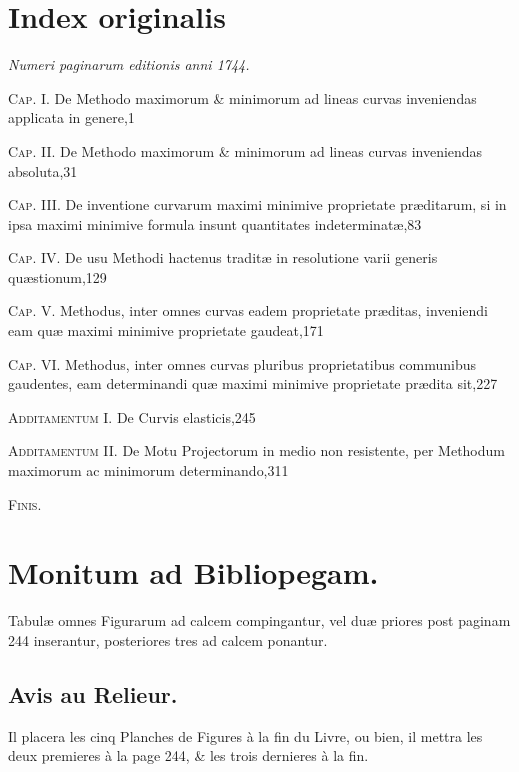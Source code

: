 \section*{Index originalis}
\noindent\textit{Numeri paginarum editionis anni 1744.}\par\bigskip
\newcommand{\oldindexentry}[3]{\par\noindent\textsc{#1.} #2\nobreak\hfill #3\par\medskip}
\oldindexentry{Cap. I}{De Methodo maximorum \& minimorum ad lineas curvas inveniendas applicata in genere,}{1}
\oldindexentry{Cap. II}{De Methodo maximorum \& minimorum ad lineas curvas inveniendas absoluta,}{31}
\oldindexentry{Cap. III}{De inventione curvarum maximi minimive proprietate præditarum, si in ipsa maximi minimive formula insunt quantitates indeterminatæ,}{83}
\oldindexentry{Cap. IV}{De usu Methodi hactenus traditæ in resolutione varii generis quæstionum,}{129}
\oldindexentry{Cap. V}{Methodus, inter omnes curvas eadem proprietate præditas, inveniendi eam quæ maximi minimive proprietate gaudeat,}{171}
\oldindexentry{Cap. VI}{Methodus, inter omnes curvas pluribus proprietatibus communibus gaudentes, eam determinandi quæ maximi minimive proprietate prædita sit,}{227}
\oldindexentry{Additamentum I}{De Curvis elasticis,}{245}
\oldindexentry{Additamentum II}{De Motu Projectorum in medio non resistente, per Methodum maximorum ac minimorum determinando,}{311}
\begin{center}\textsc{Finis.}\end{center}
\clearpage
\section*{Monitum ad Bibliopegam.}
Tabulæ omnes Figurarum ad calcem compingantur, vel duæ priores post paginam 244 inserantur, posteriores tres ad calcem ponantur.
\bigskip
\subsection*{Avis au Relieur.}
Il placera les cinq Planches de Figures à la fin du Livre, ou bien, il mettra les deux premieres à la page 244, \& les trois dernieres à la fin.
